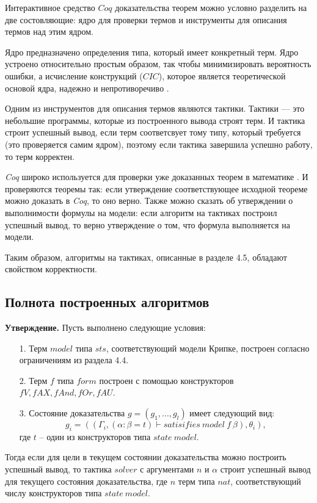\documentclass[12pt]{article}
\begin{document}
Интерактивное средство $Coq$ доказательства теорем можно условно разделить на две состовляющие: ядро для проверки термов и инструменты для описания термов над этим ядром.

Ядро предназначено определения типа, который имеет конкретный терм. Ядро устроено относительно простым образом, так чтобы минимизировать вероятность ошибки, а исчисление конструкций ($CIC$), которое является теоретической основой ядра, надежно и непротиворечиво \cite{Coquand}.

Одним из инструментов для описания термов являются тактики. Тактики —  это небольшие программы, которые из построенного вывода строят терм. 
И тактика строит успешный вывод, если терм соответсвует тому типу, который требуется (это проверяется самим ядром), поэтому если тактика завершила успешно работу, то терм корректен.

\textit{Coq} широко используется для проверки уже доказанных теорем в математике \cite{mathcomp}.
И проверяются теоремы так: если утверждение соответствующее исходной теореме можно доказать в \textit{Coq}, то оно верно. Также можно сказать об утверждении о выполнимости формулы на модели: если алгоритм на тактиках построил успешный вывод, то верно утверждение о том, что формула выполняется на модели. 

Таким образом, алгоритмы на тактиках, описанные в разделе 4.5, обладают свойством корректности.


\clearpage
\subsection{Полнота построенных алгоритмов}
\textbf{Утверждение.}
Пусть выполнено следующие условия:
\begin{enumerate}
    \item[1.] Терм $model$ типа $sts$, соответствующий модели Крипке, построен согласно ограничениям из раздела 4.4.
    \item[2.] Терм $f$ типа $form$ построен с помощью конструкторов $fV, fAX, fAnd, fOr, fAU$.
    \item[3.] Состояние доказательства $g = (g_1,...,g_l)$ имеет следующий вид:
    $$g_i = ((\Gamma_i, (\alpha: \beta=t) \vdash satisifies\ model\ f\ \beta), \theta_i),$$
    где $t$ -- один из конструкторов типа $state\ model.$
\end{enumerate}

Тогда если для цели в текущем состоянии доказательства можно построить успешный вывод, то
тактика $solver$ с аргументами $n$ и $\alpha$ строит успешный вывод для текущего состояния доказательства, где $n$ терм типа $nat$, соответствующий числу конструкторов типа $state\  model$.
\end{document}
